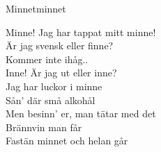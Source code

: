 \begin{song}{Minnet}{minnet}
\begin{vers}

Minne! Jag har tappat mitt minne!\\
Är jag svensk eller finne?\\
Kommer inte ihåg..\\
Inne! Är jag ut eller inne?\\
Jag har luckor i minne\\
Sån' där små alkohål\\
Men besinn' er, man tätar med det\\
Brännvin man får\\
Fastän minnet och helan går\\
\end{vers}
\end{song}
